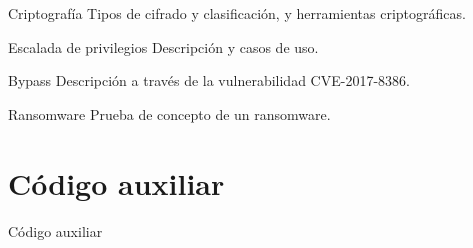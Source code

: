     \begin{frame}
        \begin{block}{Criptografía}
            Tipos de cifrado y clasificación, y herramientas criptográficas.
        \end{block}

        \begin{block}{Escalada de privilegios}
            Descripción y casos de uso.
        \end{block}

        \begin{block}{Bypass}
            Descripción a través de la vulnerabilidad CVE-2017-8386.
        \end{block}

        \begin{block}{Ransomware}
            Prueba de concepto de un ransomware.
        \end{block}
    \end{frame}

    
\section{Código auxiliar}

    \begin{frame}
        \Huge{\centerline{Código auxiliar}}
    \end{frame}


